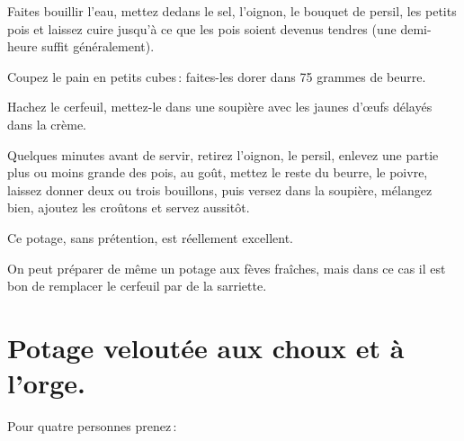 Faites bouillir l'eau, mettez dedans le sel, l’oignon, le bouquet de persil, les
petits pois et laissez cuire jusqu'à ce que les pois soient devenus tendres (une
demi-heure suffit généralement).

Coupez le pain en petits cubes : faites-les dorer dans 75 grammes de beurre.

Hachez le cerfeuil, mettez-le dans une soupière avec les jaunes d'œufs délayés
dans la crème.

Quelques minutes avant de servir, retirez l'oignon, le persil, enlevez une
partie plus ou moins grande des pois, au goût, mettez le reste du beurre, le
poivre, laissez donner deux ou trois bouillons, puis versez dans la soupière,
mélangez bien, ajoutez les croûtons et servez aussitôt.

Ce potage, sans prétention, est réellement excellent.

\sk

On peut préparer de même un potage aux fèves fraîches, mais dans ce cas il est
bon de remplacer le cerfeuil par de la sarriette.

\section*{\centering Potage veloutée aux choux et à l'orge.}

Pour quatre personnes prenez :

\medskip

